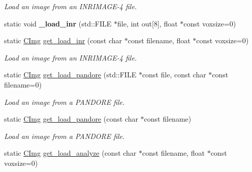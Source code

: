 \begin{DoxyCompactItemize}
\begin{DoxyCompactList}\small\item\em Load an image from an I\-N\-R\-I\-M\-A\-G\-E-\/4 file. \end{DoxyCompactList}\item 
\hypertarget{structcimg__library_1_1_c_img_ace5b0efa1467caec1bb0bca00a6358ca}{static void {\bfseries \-\_\-load\-\_\-inr} (std\-::\-F\-I\-L\-E $\ast$file, int out\mbox{[}8\mbox{]}, float $\ast$const voxsize=0)}\label{structcimg__library_1_1_c_img_ace5b0efa1467caec1bb0bca00a6358ca}

\item 
\hypertarget{structcimg__library_1_1_c_img_adc7ab95da200f83819a5b87a0b6174b5}{static \hyperlink{structcimg__library_1_1_c_img}{C\-Img} \hyperlink{structcimg__library_1_1_c_img_adc7ab95da200f83819a5b87a0b6174b5}{get\-\_\-load\-\_\-inr} (const char $\ast$const filename, float $\ast$const voxsize=0)}\label{structcimg__library_1_1_c_img_adc7ab95da200f83819a5b87a0b6174b5}

\begin{DoxyCompactList}\small\item\em Load an image from an I\-N\-R\-I\-M\-A\-G\-E-\/4 file. \end{DoxyCompactList}\item 
\hypertarget{structcimg__library_1_1_c_img_a7eb5f1206085b6929c455b7f6c46ba50}{static \hyperlink{structcimg__library_1_1_c_img}{C\-Img} \hyperlink{structcimg__library_1_1_c_img_a7eb5f1206085b6929c455b7f6c46ba50}{get\-\_\-load\-\_\-pandore} (std\-::\-F\-I\-L\-E $\ast$const file, const char $\ast$const filename=0)}\label{structcimg__library_1_1_c_img_a7eb5f1206085b6929c455b7f6c46ba50}

\begin{DoxyCompactList}\small\item\em Load an image from a P\-A\-N\-D\-O\-R\-E file. \end{DoxyCompactList}\item 
\hypertarget{structcimg__library_1_1_c_img_a3f2c9c193baa14a640777242798301f0}{static \hyperlink{structcimg__library_1_1_c_img}{C\-Img} \hyperlink{structcimg__library_1_1_c_img_a3f2c9c193baa14a640777242798301f0}{get\-\_\-load\-\_\-pandore} (const char $\ast$const filename)}\label{structcimg__library_1_1_c_img_a3f2c9c193baa14a640777242798301f0}

\begin{DoxyCompactList}\small\item\em Load an image from a P\-A\-N\-D\-O\-R\-E file. \end{DoxyCompactList}\item 
\hypertarget{structcimg__library_1_1_c_img_ae9cf619d3ff9e70dfa352216dc67f388}{static \hyperlink{structcimg__library_1_1_c_img}{C\-Img} \hyperlink{structcimg__library_1_1_c_img_ae9cf619d3ff9e70dfa352216dc67f388}{get\-\_\-load\-\_\-analyze} (const char $\ast$const filename, float $\ast$const voxsize=0)}\label{structcimg__library_1_1_c_img_ae9cf619d3ff9e70dfa352216dc67f388}


\end{DoxyCompactItemize}
